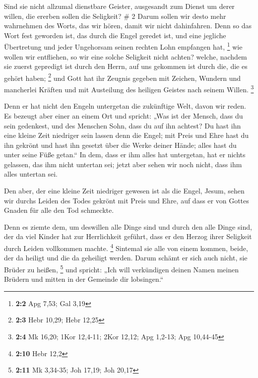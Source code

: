  Sind sie nicht allzumal dienstbare Geister, ausgesandt
zum Dienst um derer willen, die ererben sollen die Seligkeit? \# 2
 Darum sollen wir desto mehr wahrnehmen des Worts, das wir
hören, damit wir nicht dahinfahren.  Denn so das Wort fest
geworden ist, das durch die Engel geredet ist, und eine jegliche
Übertretung und jeder Ungehorsam seinen rechten Lohn empfangen hat,
\footnote{\textbf{2:2} Apg 7,53; Gal 3,19}  wie wollen wir
entfliehen, so wir eine solche Seligkeit nicht achten? welche, nachdem
sie zuerst gepredigt ist durch den Herrn, auf uns gekommen ist durch
die, die es gehört haben; \footnote{\textbf{2:3} Hebr 10,29; Hebr 12,25}
 und Gott hat ihr Zeugnis gegeben mit Zeichen, Wundern und
mancherlei Kräften und mit Austeilung des heiligen Geistes nach seinem
Willen. \footnote{\textbf{2:4} Mk 16,20; 1Kor 12,4-11; 2Kor 12,12; Apg
  1,2-13; Apg 10,44-45}

 Denn er hat nicht den Engeln untergetan die zukünftige
Welt, davon wir reden.  Es bezeugt aber einer an einem Ort
und spricht: „Was ist der Mensch, dass du sein gedenkest, und des
Menschen Sohn, dass du auf ihn achtest?  Du hast ihn eine
kleine Zeit niedriger sein lassen denn die Engel; mit Preis und Ehre
hast du ihn gekrönt und hast ihn gesetzt über die Werke deiner Hände;
 alles hast du unter seine Füße getan.`` In dem, dass er
ihm alles hat untergetan, hat er nichts gelassen, das ihm nicht untertan
sei; jetzt aber sehen wir noch nicht, dass ihm alles untertan sei.

 Den aber, der eine kleine Zeit niedriger gewesen ist als
die Engel, Jesum, sehen wir durchs Leiden des Todes gekrönt mit Preis
und Ehre, auf dass er von Gottes Gnaden für alle den Tod schmeckte.

 Denn es ziemte dem, um deswillen alle Dinge sind und
durch den alle Dinge sind, der da viel Kinder hat zur Herrlichkeit
geführt, dass er den Herzog ihrer Seligkeit durch Leiden vollkommen
machte. \footnote{\textbf{2:10} Hebr 12,2}  Sintemal sie
alle von einem kommen, beide, der da heiligt und die da geheiligt
werden. Darum schämt er sich auch nicht, sie Brüder zu heißen,
\footnote{\textbf{2:11} Mk 3,34-35; Joh 17,19; Joh 20,17}
 und spricht: „Ich will verkündigen deinen Namen meinen
Brüdern und mitten in der Gemeinde dir lobsingen.``

